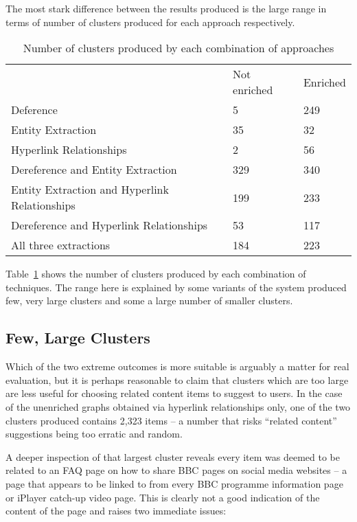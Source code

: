 The most stark difference between the results produced is the large
range in terms of number of clusters produced for each approach
respectively.

\begin{table}[h]
  \centering
  \caption{Number of clusters produced by each combination of approaches}
  \label{tbl:cluster-counts}
  \begin{tabular}{lll}
    & Not enriched & Enriched \\
    Deference                                     & 5            & 249      \\
    Entity Extraction                             & 35           & 32       \\
    Hyperlink Relationships                       & 2            & 56       \\
    Dereference and Entity Extraction             & 329          & 340      \\
    Entity Extraction and Hyperlink Relationships & 199          & 233      \\
    Dereference and Hyperlink Relationships       & 53           & 117      \\
    All three extractions                         & 184          & 223     
  \end{tabular}
\end{table}

Table~\ref{tbl:cluster-counts} shows the number of clusters produced
by each combination of techniques. The range here is explained by
some variants of the system produced few, very large clusters and
some a large number of smaller clusters.

\subsection{Few, Large Clusters}

Which of the two extreme outcomes is more suitable is arguably a
matter for real evaluation, but it is perhaps reasonable to claim that
clusters which are too large are less useful for choosing related
content items to suggest to users. In the case of the unenriched graphs
obtained via hyperlink relationships only, one of the two clusters
produced contains 2,323 items -- a number that risks
``related content'' suggestions being too erratic and random.

A deeper inspection of that largest cluster reveals every item was
deemed to be related to an FAQ page on how to share BBC pages on
social media websites -- a page that appears to be linked to from
every BBC programme information page or iPlayer catch-up video page.
This is clearly not a good indication of the content of the page
and raises two immediate issues:

